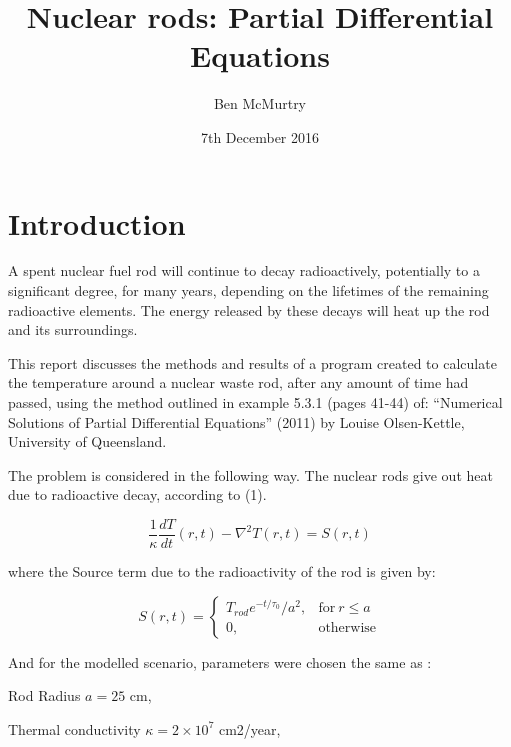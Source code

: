 \documentclass{article}
\begin{document}
\title{Nuclear rods: Partial Differential Equations} 
\author{Ben McMurtry}
\date{7th December 2016} 	
\maketitle







\section{Introduction}
\label{sec:introduction}

A spent nuclear fuel rod will continue to decay radioactively, potentially to a significant degree, for many years, depending on the lifetimes of the remaining radioactive elements. The energy released by these decays will heat up the rod and its surroundings.

This report discusses the methods and results of a program created to calculate the temperature around a nuclear waste rod, after any amount of time had passed, using the method outlined in example 5.3.1 (pages 41-44) of: ``Numerical Solutions of Partial Differential Equations'' (2011) by Louise Olsen-Kettle, University of Queensland\cite{Olsen-Kettle}.

The problem is considered in the following way. The nuclear rods give out heat due to radioactive decay, according to (1).

\begin{equation}
\frac{1}{\kappa} \frac{dT}{dt}(r,t) - \nabla^2 T(r,t) = S(r,t)
\end{equation}

where the Source term due to the radioactivity of the rod is given by:

\begin{equation}
S(r,t) = \begin{cases}
      T_{rod}e^{-t/\tau_0} / a^2, & \text{for}\ r\leq a \\
      0, & \text{otherwise}
    \end{cases}
\end{equation}

And for the modelled scenario, parameters were chosen the same as \cite{Olsen-Kettle}: 

\vspace{5mm}

Rod Radius $a = 25$ cm, 

Thermal conductivity $\kappa = 2\times10^7$ cm2/year, 
\end{document}
